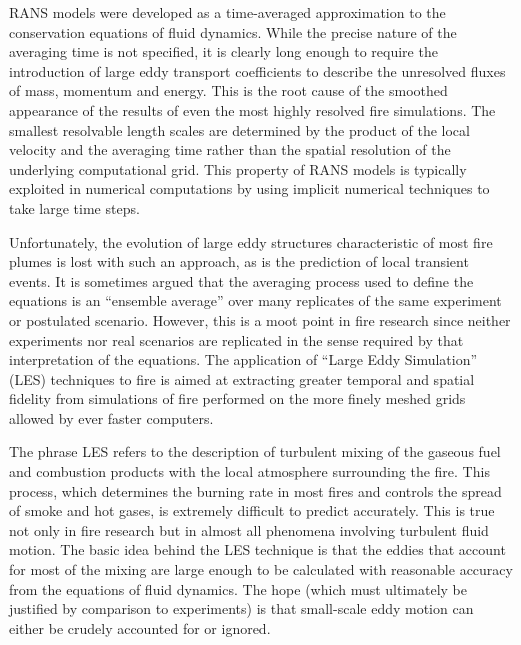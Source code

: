 \documentclass[11pt]{book}
\begin{document}
RANS models were developed as a time-averaged approximation to the conservation equations of fluid dynamics.
While the precise nature of the averaging time is not specified, it is clearly long enough to
require the introduction of large eddy transport coefficients to describe the unresolved fluxes of mass,
momentum and energy. This is the root cause of the smoothed appearance of the results of even the most
highly resolved fire simulations. The smallest resolvable length scales are determined by the product
of the local velocity and the averaging time rather than the spatial resolution of the underlying computational grid.
This property of RANS models is typically exploited in numerical computations by using implicit
numerical techniques to take large time steps.

Unfortunately, the evolution of large eddy structures characteristic of most fire plumes is lost
with such an approach, as is the prediction of local transient events. It is sometimes
argued that the averaging process used to define the equations is an ``ensemble average'' over many
replicates of the same experiment or postulated scenario. However, this is a moot point in
fire research since neither experiments nor real scenarios are replicated in the sense required
by that interpretation of the equations. The application of ``Large Eddy Simulation'' (LES)
techniques to fire is aimed at extracting greater temporal and spatial fidelity from simulations
of fire performed on the more finely meshed grids allowed by ever faster computers.

The phrase LES refers to the description of turbulent mixing of the gaseous fuel and combustion
products with the local atmosphere surrounding the fire. This process, which determines the burning
rate in most fires and controls the spread of smoke and hot gases, is extremely difficult
to predict accurately. This is true not only in fire research but in almost all phenomena
involving turbulent fluid motion. The basic idea behind the LES technique is that the eddies
that account for most of the mixing are large enough to be calculated with reasonable
accuracy from the equations of fluid dynamics. The hope (which must ultimately be justified
by comparison to experiments) is that small-scale eddy motion can either be crudely accounted for or ignored.
\end{document}
